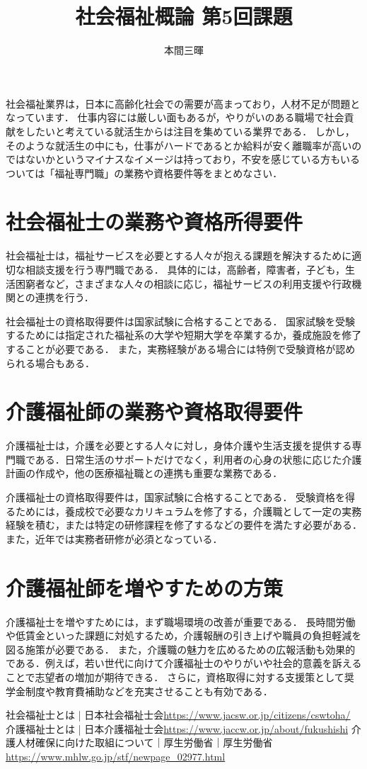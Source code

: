 \documentclass[titlepage,a4paper]{jsarticle}
\title{社会福祉概論 第5回課題}
\author{本間三暉}
\begin{document}
\maketitle
社会福祉業界は，日本に高齢化社会での需要が高まっており，人材不足が問題となっています．
仕事内容には厳しい面もあるが，やりがいのある職場で社会貢献をしたいと考えている就活生からは注目を集めている業界である．
しかし，そのような就活生の中にも，仕事がハードであるとか給料が安く離職率が高いのではないかというマイナスなイメージは持っており，不安を感じている方もいる
ついては「福祉専門職」の業務や資格要件等をまとめなさい．
\section{社会福祉士の業務や資格所得要件}
社会福祉士は，福祉サービスを必要とする人々が抱える課題を解決するために適切な相談支援を行う専門職である．
具体的には，高齢者，障害者，子ども，生活困窮者など，さまざまな人々の相談に応じ，福祉サービスの利用支援や行政機関との連携を行う．

社会福祉士の資格取得要件は国家試験に合格することである．
国家試験を受験するためには指定された福祉系の大学や短期大学を卒業するか，養成施設を修了することが必要である．
また，実務経験がある場合には特例で受験資格が認められる場合もある．\cite{1}

\section{介護福祉師の業務や資格取得要件}
介護福祉士は，介護を必要とする人々に対し，身体介護や生活支援を提供する専門職である．日常生活のサポートだけでなく，利用者の心身の状態に応じた介護計画の作成や，他の医療福祉職との連携も重要な業務である．

介護福祉士の資格取得要件は，国家試験に合格することである．
受験資格を得るためには，養成校で必要なカリキュラムを修了する，介護職として一定の実務経験を積む，または特定の研修課程を修了するなどの要件を満たす必要がある．
また，近年では実務者研修が必須となっている．\cite{2}

\section{介護福祉師を増やすための方策}
介護福祉士を増やすためには，まず職場環境の改善が重要である．
長時間労働や低賃金といった課題に対処するため，介護報酬の引き上げや職員の負担軽減を図る施策が必要である．
また，介護職の魅力を広めるための広報活動も効果的である．例えば，若い世代に向けて介護福祉士のやりがいや社会的意義を訴えることで志望者の増加が期待できる．
さらに，資格取得に対する支援策として奨学金制度や教育費補助などを充実させることも有効である．\cite{3}
\begin{thebibliography}{99}
  社会福祉士とは | 日本社会福祉士会\url{https://www.jacsw.or.jp/citizens/cswtoha/}
  介護福祉士とは | 日本介護福祉士会\url{https://www.jaccw.or.jp/about/fukushishi}
  介護人材確保に向けた取組について｜厚生労働省｜厚生労働省\url{https://www.mhlw.go.jp/stf/newpage_02977.html}
\end{thebibliography}
\end{document}
